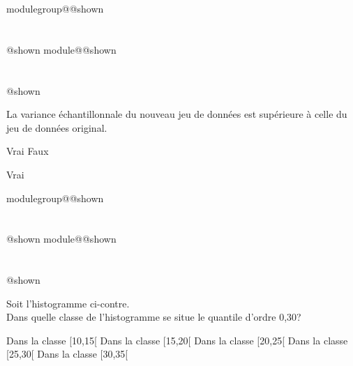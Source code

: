 \documentclass{Evaluation}
\makeatletter
\newcommand{\currentmodulekey}{}
\newcommand{\currentmoduletitle}{}
\newcommand{\currentgroupkey}{}
\newcommand{\currentgrouptitle}{}
\newcommand{\showmoduleifneeded}{%
  \ifx\currentgroupkey\empty\else
    \expandafter\ifx\csname modulegroup@\currentgroupkey @shown\endcsname\relax
      \section*{\currentgrouptitle}%
      \expandafter\gdef\csname modulegroup@\currentgroupkey @shown\endcsname{1}%
    \fi
  \fi
  \expandafter\ifx\csname module@\currentmodulekey @shown\endcsname\relax
    \section*{\currentmoduletitle}%
    \expandafter\gdef\csname module@\currentmodulekey @shown\endcsname{1}%
  \fi
}
\newenvironment{H23}{\showmoduleifneeded}{}
\newenvironment{H26}{\showmoduleifneeded}{}
\makeatother
\begin{document}
\begin{questions}
\begin{H23}
\begin{parts}
\begin{subparts}
\subpart La variance échantillonnale du nouveau jeu de données est supérieure à celle du jeu de données original.

    \begin{oneparcheckboxes}
        \correctchoice Vrai
        \choice Faux
    \end{oneparcheckboxes}

\begin{solution}
    Vrai
\end{solution}

\end{subparts}
\end{parts}
\end{H23}

\begin{H26}
\question {} %
\noindent
\begin{minipage}[t]{0.5\linewidth}\vspace{0pt}
Soit l'histogramme ci-contre.\\[0.5em]

Dans quelle classe de l'histogramme se situe le quantile d'ordre 0,30?

\begin{checkboxes}
  \choice Dans la classe [10,15[
  \correctchoice Dans la classe [15,20[
  \choice Dans la classe [20,25[
  \choice Dans la classe [25,30[
  \choice Dans la classe [30,35[
\end{checkboxes}
\end{minipage}\hfill
\begin{minipage}[t]{0.42\linewidth}\vspace{0pt}
\centering
{}
\end{minipage}
\end{H26}
\end{questions}
\end{document}
